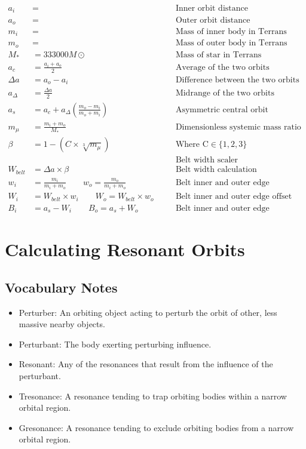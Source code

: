 \documentclass[
  letterpaper,
]{book}
\providecommand{\tightlist}{%
  \setlength{\itemsep}{0pt}\setlength{\parskip}{0pt}}
\begin{document}
\[
\begin{align}
a_i &= &&\text{Inner orbit distance} \\
a_o &= &&\text{Outer orbit distance} \\[0.5em]
m_i &= &&\text{Mass of inner body in Terrans} \\
m_o &= &&\text{Mass of outer body in Terrans} \\[0.5em]
M_* & = 333000M⊙ \qquad &&\text{Mass of star in Terrans} \\[0.5em]
a_c &= \frac{a_i + a_o}{2} \qquad &&\text{Average of the two orbits} \\[0.5em]
\Delta a &= a_o - a_i \qquad &&\text{Difference between the two orbits} \\[0.5em]
a_\Delta &= \frac{\Delta a}{2} \qquad &&\text{Midrange of the two orbits} \\[0.5em] 
a_s &= a_c + a_\Delta \left(\frac{m_o - m_i}{m_o + m_i}\right) \qquad &&\text{Asymmetric central orbit} \\[0.5em]
m_\mu &= \frac{m_i + m_o}{M_*} \qquad &&\text{Dimensionless systemic mass ratio} \\[0.5em]
\beta &= 1 - (C \times \sqrt[3]{m_\mu}) \qquad &&\text{Where C} \in \{1, 2, 3\} \\
&&&\text{Belt width scaler} \\[0.5em]
W_{belt} &= \Delta a \times \beta \qquad &&\text{Belt width calculation}\\[0.5em]
w_i &= \frac{m_i}{m_i + m_o} \qquad w_o = \frac{m_o}{m_i + m_o} \quad &&\text{Belt inner and outer edge adjustments} \\[0.5em]
W_i &= W_{belt} \times w_i \qquad W_o = W_{belt} \times w_o \quad && \text{Belt inner and outer edge offset calculations}\\[0.5em]
B_i &= a_s - W_i \qquad B_o = a_s + W_o \qquad &&\text{Belt inner and outer edge calculations}
\end{align}
\]

\section{Calculating Resonant Orbits}\label{calculating-resonant-orbits}

\subsection{Vocabulary Notes}\label{vocabulary-notes}

\begin{itemize}
\tightlist
\item
  Perturber: An orbiting object acting to perturb the orbit of other,
  less massive nearby objects.
\item
  Perturbant: The body exerting perturbing influence.
\item
  Resonant: Any of the resonances that result from the influence of the
  perturbant.
\item
  Tresonance: A resonance tending to trap orbiting bodies within a
  narrow orbital region.
\item
  Gresonance: A resonance tending to exclude orbiting bodies from a
  narrow orbital region.
\end{itemize}
\end{document}
